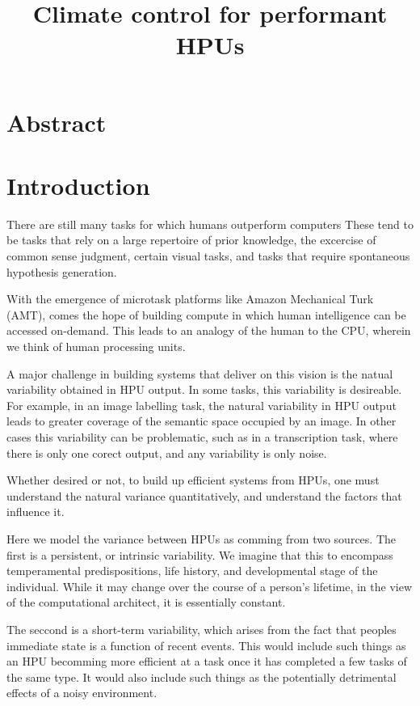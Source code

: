 \documentclass[letterpaper, 11pt, twocolumn]{article}
\title{Climate control for performant HPUs}
\author{}
\begin{document}
\maketitle

\section*{Abstract}
\textbf{}
\section*{Introduction}
There are still many tasks for which humans outperform computers
These tend to be tasks that rely on a large repertoire of prior knowledge,
the excercise of common sense judgment, certain visual tasks, and 
tasks that require spontaneous hypothesis generation.

With the emergence of microtask platforms like Amazon Mechanical Turk (AMT),
comes the hope of building compute in which human intelligence can be accessed
on-demand.  This leads to an analogy of the human to the CPU, wherein we think
of human processing units.

A major challenge in building systems that deliver on this vision is the 
natual variability obtained in HPU output.  In some tasks, this variability
is desireable.  For example, in an image labelling task, the natural 
variability in
HPU output leads to greater coverage of the semantic space occupied by an 
image.  In other cases this variability can be problematic, such as in a 
transcription task, where there is only one corect output, and any variability
is only noise.

Whether desired or not, to build up efficient systems from HPUs, one must 
understand the natural variance quantitatively, and understand the factors that
influence it.

Here we model the variance between HPUs as comming from two sources.  The first
is a persistent, or intrinsic variability.  We imagine that this to encompass  
temperamental predispositions, life history, and developmental stage of the 
individual.  While
it may change over the course of a person's lifetime, in the view of the 
computational architect, it is essentially constant.

The seccond is a short-term variability, which arises from the fact that 
peoples immediate state is a function of recent events.  This would include
such things as an HPU becomming more efficient at a task once it has completed
a few tasks of the same type.  It would also include such things as the 
potentially detrimental effects of a noisy environment.
\end{document}
